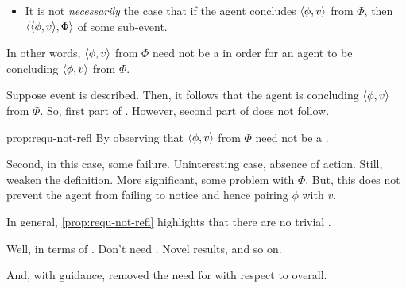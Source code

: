 \begin{note}
  \begin{proposition}
    \label{prop:requ-not-refl}

    \begin{itemize}
    \item
      It is not \emph{necessarily} the case that if the agent concludes \(\langle \phi, v \rangle\) from \(\Phi\), then \(\langle \langle \phi, v \rangle, \Phi \rangle\) \requ{} of some sub-event.
    \end{itemize}
    \vspace{-\baselineskip}
  \end{proposition}

  In other words, \(\langle \phi, v \rangle\) from \(\Phi\) need not be a \fc{} in order for an agent to be concluding \(\langle \phi, v \rangle\) from \(\Phi\).

  Suppose event is described.
    Then, it follows that the agent is concluding \(\langle \phi, v \rangle\) from \(\Phi\).
    So, first part of \fc{}.
    However, second part of \fc{} does not follow.

    \begin{argument}{prop:requ-not-refl}
      By observing that \(\langle \phi, v \rangle\) from \(\Phi\) need not be a \fc{}.

      Second, in this case, some failure.
      Uninteresting case, absence of action.
      Still, weaken the definition.
      More significant, some problem with \(\Phi\).
      But, this does not prevent the agent from failing to notice and hence pairing \(\phi\) with \(v\).
  \end{argument}

  In general, \autoref{prop:requ-not-refl} highlights that there are no trivial .

  Well, in terms of \tC{}.
  Don't need \tC{}.
  Novel results, and so on.

  And, with guidance, removed the need for \tC{} with respect to overall.
\end{note}

